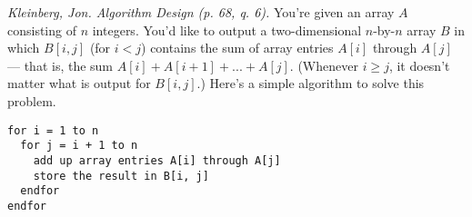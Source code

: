 \documentclass[solutionorbox,answers]{exam}
\begin{document}
\begin{questions}

\pagebreak

\question \textit{Kleinberg, Jon. Algorithm Design (p. 68, q. 6).} You're given an array $A$ consisting of $n$ integers. You'd like to output a two-dimensional $n$-by-$n$ array $B$ in which $B[i, j]$ (for $i < j$) contains the sum of array entries $A[i]$ through $A[j]$ — that is, the sum $A[i]+ A[i + 1]+... + A[j]$. (Whenever $i \geq j$, it doesn't matter what is output for $B[i,j]$.)  
Here's a simple algorithm to solve this problem. 

\begin{lstlisting}
for i = 1 to n
  for j = i + 1 to n  
    add up array entries A[i] through A[j]
    store the result in B[i, j]
  endfor  
endfor 
\end{lstlisting}


\end{questions}
\end{document}
